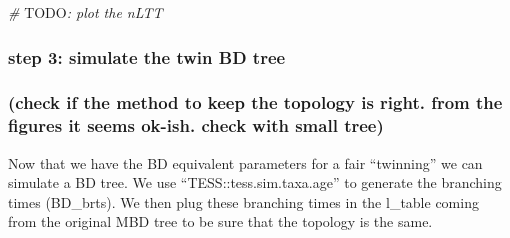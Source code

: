 \documentclass[]{article}
\newenvironment{Shaded}{\begin{snugshade}}{\end{snugshade}}
\newcommand{\KeywordTok}[1]{\textcolor[rgb]{0.13,0.29,0.53}{\textbf{#1}}}
\newcommand{\DecValTok}[1]{\textcolor[rgb]{0.00,0.00,0.81}{#1}}
\newcommand{\StringTok}[1]{\textcolor[rgb]{0.31,0.60,0.02}{#1}}
\newcommand{\CommentTok}[1]{\textcolor[rgb]{0.56,0.35,0.01}{\textit{#1}}}
\newcommand{\ControlFlowTok}[1]{\textcolor[rgb]{0.13,0.29,0.53}{\textbf{#1}}}
\newcommand{\OperatorTok}[1]{\textcolor[rgb]{0.81,0.36,0.00}{\textbf{#1}}}
\newcommand{\AlertTok}[1]{\textcolor[rgb]{0.94,0.16,0.16}{#1}}
\newcommand{\NormalTok}[1]{#1}
\begin{document}
\begin{Shaded}
\end{Shaded}

\begin{Shaded}
\begin{Highlighting}[]
\CommentTok{# }\AlertTok{TODO}\CommentTok{: plot the nLTT}
\end{Highlighting}
\end{Shaded}

\subsubsection{step 3: simulate the twin BD
tree}\label{step-3-simulate-the-twin-bd-tree}

\subsubsection{(check if the method to keep the topology is right. from
the figures it seems ok-ish. check with small
tree)}\label{check-if-the-method-to-keep-the-topology-is-right.-from-the-figures-it-seems-ok-ish.-check-with-small-tree}

Now that we have the BD equivalent parameters for a fair ``twinning'' we
can simulate a BD tree. We use ``TESS::tess.sim.taxa.age'' to generate
the branching times (BD\_brts). We then plug these branching times in
the l\_table coming from the original MBD tree to be sure that the
topology is the same.
\end{document}
